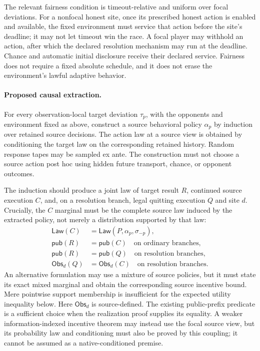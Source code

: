 \documentclass[11pt]{article}
\newcommand{\Obs}{\mathsf{Obs}}
\newcommand{\Law}{\mathsf{Law}}
\newcommand{\pub}{\mathsf{pub}}
\begin{document}
The relevant fairness condition is timeout-relative and uniform over focal
deviations.  For a nonfocal honest site, once its prescribed honest action is
enabled and available, the fixed environment must service that action before
the site's deadline; it may not let timeout win the race.  A focal player may
withhold an action, after which the declared resolution mechanism may run at
the deadline.  Chance and automatic initial disclosure receive their declared
service.  Fairness does not require a fixed absolute schedule, and it does not
erase the environment's lawful adaptive behavior.

\paragraph{Proposed causal extraction.}
For every observation-local target deviation $\tau_p$, with the opponents and
environment fixed as above, construct a source behavioral policy $\alpha_p$
by induction over retained source decisions.  The action law at a source view
is obtained by conditioning the target law on the corresponding retained
history.  Random response tapes may be sampled ex ante.  The construction must
not choose a source action post hoc using hidden future transport, chance, or
opponent outcomes.

The induction should produce a joint law of target result $R$, continued source
execution $C$, and, on a resolution branch, legal quitting execution $Q$ and
site $d$.  Crucially, the $C$ marginal must be the complete source law induced
by the extracted policy, not merely a distribution supported by that law:
\begin{align*}
 \Law(C) &= \Law(P,\alpha_p,\sigma_{-p}),\\
 \pub(R) &= \pub(C) \quad\text{on ordinary branches},\\
 \pub(R) &= \pub(Q) \quad\text{on resolution branches},\\
 \Obs_d(Q) &= \Obs_d(C) \quad\text{on resolution branches}.
\end{align*}
An alternative formulation may use a mixture of source policies, but it must
state its exact mixed marginal and obtain the corresponding source incentive
bound.  Mere pointwise support membership is insufficient for the expected
utility inequality below.
Here $\Obs_d$ is source-defined.  The existing public-prefix predicate is a
sufficient choice when the realization proof supplies its equality.  A weaker
information-indexed incentive theorem may instead use the focal source view,
but its probability law and conditioning must also be proved by this coupling;
it cannot be assumed as a native-conditioned premise.
\end{document}

